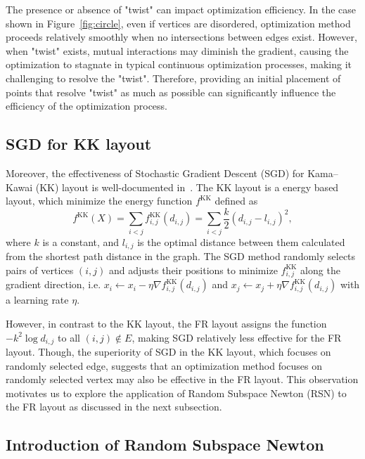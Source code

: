 \documentclass[dvipdfmx,lettersize,journal]{IEEEtran}
\begin{document}
The presence or absence of "twist" can impact optimization efficiency.
In the case shown in Figure~\ref{fig:circle}, even if vertices are disordered, optimization method proceeds relatively smoothly when no intersections between edges exist.
However, when "twist" exists, mutual interactions may diminish the gradient, causing the optimization to stagnate in typical continuous optimization processes, making it challenging to resolve the "twist".
Therefore, providing an initial placement of points that resolve "twist" as much as possible can significantly influence the efficiency of the optimization process.

\subsection{SGD for KK layout}\label{ssec:sgd}

Moreover, the effectiveness of Stochastic Gradient Descent (SGD) for Kama--Kawai (KK) layout is well-documented in~\cite{8419285}.
The KK layout is a energy based layout, which minimize the energy function $f^{\mathrm{KK}}$ defined as
\begin{equation*}
  f^{\mathrm{KK}}(X) = \sum_{i<j} f^{\mathrm{KK}}_{i,j}(d_{i,j}) = \sum_{i<j} \frac{k}{2}(d_{i,j}-l_{i,j})^2,
\end{equation*}
where $k$ is a constant, and $l_{i,j}$ is the optimal distance between them calculated from the shortest path distance in the graph.
The SGD method randomly selects pairs of vertices $(i,j)$ and adjusts their positions to minimize $f^{\mathrm{KK}}_{i,j}$ along the gradient direction, i.e. $x_i \gets x_i - \eta \nabla f^{\mathrm{KK}}_{i,j}(d_{i,j})$ and $x_j \gets x_j + \eta \nabla f^{\mathrm{KK}}_{i,j}(d_{i,j})$ with a learning rate $\eta$.

However, in contrast to the KK layout, the FR layout assigns the function $-k^2\log{d_{i,j}}$ to all $(i,j) \notin E$, making SGD relatively less effective for the FR layout.
Though, the superiority of SGD in the KK layout, which focuses on randomly selected edge, suggests that an optimization method focuses on randomly selected vertex may also be effective in the FR layout.
This observation motivates us to explore the application of Random Subspace Newton (RSN) to the FR layout as discussed in the next subsection.

\subsection{Introduction of Random Subspace Newton}\label{ssec:introRSN}
\end{document}
